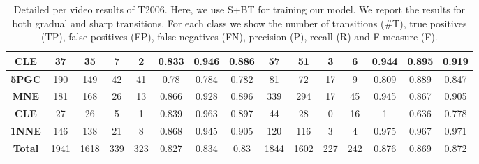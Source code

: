 \documentclass[journal]{IEEEtran}
\begin{document}
\begin{table*}[h]
\begin{tabular}{|c|c|c|c|c|c|c|c|c|c|c|c|c|c|c|}
\textbf{CLE}       & 37            & 35          & 7           & 2           & 0.833      & 0.946      & 0.886      & 57            & 51          & 3           & 6           & 0.944      & 0.895      & 0.919      \\ \hline
\textbf{5PGC} & 190           & 149         & 42          & 41          & 0.78       & 0.784      & 0.782      & 81            & 72          & 17          & 9           & 0.809      & 0.889      & 0.847      \\ \hline
\textbf{MNE}     & 181           & 168         & 26          & 13          & 0.866      & 0.928      & 0.896      & 339           & 294         & 17          & 45          & 0.945      & 0.867      & 0.905      \\ \hline
\textbf{CLE}       & 27            & 26          & 5           & 1           & 0.839      & 0.963      & 0.897      & 44            & 28          & 0           & 16          & 1          & 0.636      & 0.778      \\ \hline
\textbf{1NNE}    & 146           & 138         & 21          & 8           & 0.868      & 0.945      & 0.905      & 120           & 116         & 3           & 4           & 0.975      & 0.967      & 0.971      \\ \hline
\textbf{Total}                     & 1941          & 1618        & 339         & 323         & 0.827      & 0.834      & 0.83       & 1844          & 1602        & 227         & 242         & 0.876      & 0.869      & 0.872      \\ \hline
\end{tabular}
\caption{Detailed per video results of T2006. Here, we use S+BT for training our model. We report the results for both gradual and sharp transitions. For each class we show the number of transitions (\#T), true positives (TP), false positives (FP), false negatives (FN), precision (P), recall (R) and F-measure (F).}
\label{2006_01}
\end{table*}
\end{document}
